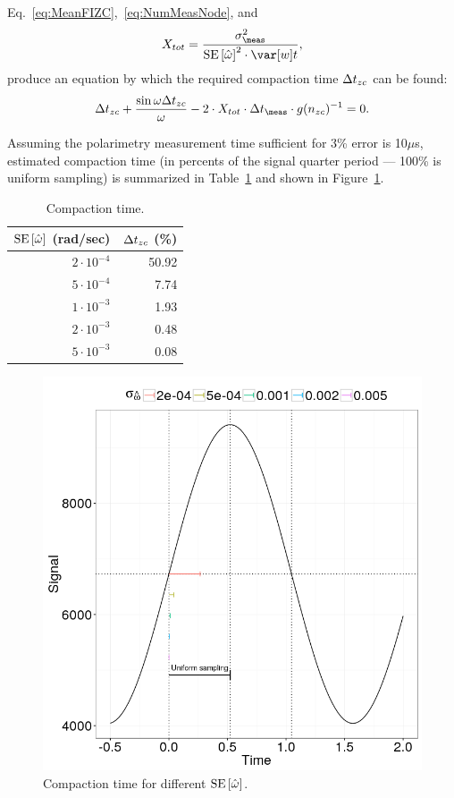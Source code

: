 \documentclass{article}
\begin{document}
Eq.~\eqref{eq:MeanFIZC},~\eqref{eq:NumMeasNode}, and
\[
	\stat* = \stat,
\]
produce an equation by which the required compaction time $\Delta t_{zc}$ can be found:
\begin{equation}\label{eq:CmpTEq}
	\dtnd + \frac{\sin\omega\dtnd}{\omega} - 2\cdot \stat* \cdot\dtm \cdot g(\Nnd)^{-1}= 0.
\end{equation}

Assuming the polarimetry measurement time sufficient for 3\% error is 10$\mu$s, estimated compaction time (in percents of the signal quarter period --- 100\% is uniform sampling) is summarized in Table~\ref{tbl:CmpTvsSEw} and shown in Figure~\ref{fig:CmpTvsSEw}.

\newcommand{\vp}[2]{{#1}\cdot 10^{#2}}
\begin{table}[h]
	\centering
	\caption{Compaction time.\label{tbl:CmpTvsSEw}}
	\begin{tabular}{rr}
		\hline
		$\SE{\hat{\omega}}$ (rad/sec) & $\Delta t_{zc}$ (\%) \\ \hline
		$\vp{2}{-4}$ &        50.92 \\
		$\vp{5}{-4}$ &         7.74 \\
		$\vp{1}{-3}$ &         1.93 \\
		$\vp{2}{-3}$ &         0.48 \\
		$\vp{5}{-3}$ &         0.08 \\ \hline
	\end{tabular}
\end{table}

\begin{figure}[h]
	\centering
	\includegraphics[scale=.5]{img/StatReq/CmpTvsSEw}
	\caption{Compaction time for different $\SE{\hat{\omega}}$.\label{fig:CmpTvsSEw}}
\end{figure}
\end{document}
